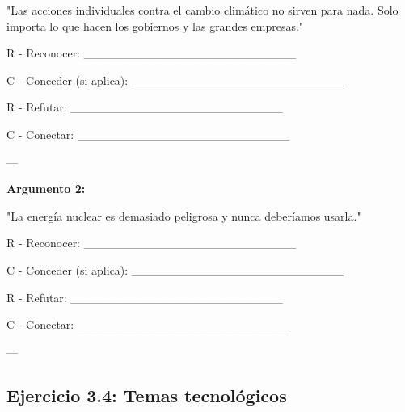 \documentclass[a4paper,11pt]{article}
\begin{document}
"Las acciones individuales contra el cambio climático no sirven para nada. Solo importa lo que hacen los gobiernos y las grandes empresas."

\vspace{0.2cm}

R - Reconocer: _________________________

\vspace{0.2cm}

C - Conceder (si aplica): _________________________

\vspace{0.2cm}

R - Refutar: _________________________

\vspace{0.2cm}

C - Conectar: _________________________

\vspace{0.2cm}

---

\vspace{0.2cm}

\textbf{Argumento 2:}

"La energía nuclear es demasiado peligrosa y nunca deberíamos usarla."

\vspace{0.2cm}

R - Reconocer: _________________________

\vspace{0.2cm}

C - Conceder (si aplica): _________________________

\vspace{0.2cm}

R - Refutar: _________________________

\vspace{0.2cm}

C - Conectar: _________________________

\vspace{0.2cm}

---

\vspace{0.2cm}

\subsection{Ejercicio 3.4: Temas tecnológicos}

\vspace{0.2cm}
\end{document}
